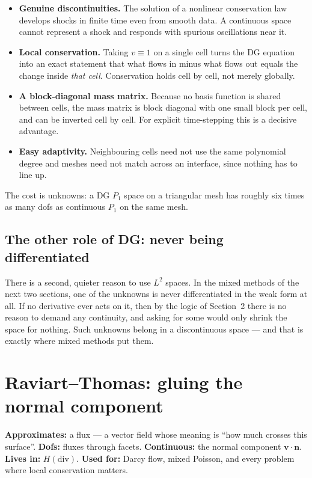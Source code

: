 \documentclass[11pt,a4paper]{article}
\newcommand{\Hdiv}{H(\mathrm{div})}
\newcommand{\bn}{\mathbf{n}}
\newcommand{\bv}{\mathbf{v}}
\begin{document}
\begin{itemize}
\item \textbf{Genuine discontinuities.} The solution of a nonlinear conservation
  law develops shocks in finite time even from smooth data. A continuous space
  cannot represent a shock and responds with spurious oscillations near it.
\item \textbf{Local conservation.} Taking $v \equiv 1$ on a single cell turns
  the DG equation into an exact statement that what flows in minus what flows
  out equals the change inside \emph{that cell}. Conservation holds cell by
  cell, not merely globally.
\item \textbf{A block-diagonal mass matrix.} Because no basis function is shared
  between cells, the mass matrix is block diagonal with one small block per
  cell, and can be inverted cell by cell. For explicit time-stepping this is a
  decisive advantage.
\item \textbf{Easy adaptivity.} Neighbouring cells need not use the same
  polynomial degree and meshes need not match across an interface, since nothing
  has to line up.
\end{itemize}

The cost is unknowns: a DG $P_1$ space on a triangular mesh has roughly six
times as many dofs as continuous $P_1$ on the same mesh.

\subsection{The other role of DG: never being differentiated}

There is a second, quieter reason to use $L^2$ spaces. In the mixed methods of
the next two sections, one of the unknowns is never differentiated in the weak
form at all. If no derivative ever acts on it, then by the logic of
Section~2 there is no reason to demand any continuity, and asking for some
would only shrink the space for nothing. Such unknowns belong in a
discontinuous space --- and that is exactly where mixed methods put them.

\FloatBarrier

\section{Raviart--Thomas: gluing the normal component}
\label{sec:rt}

\begin{keypoint}[cHdiv]
\textbf{Approximates:} a flux --- a vector field whose meaning is ``how much
crosses this surface''.\quad
\textbf{Dofs:} fluxes through facets.\quad
\textbf{Continuous:} the normal component $\bv\cdot\bn$.\quad
\textbf{Lives in:} $\Hdiv$.\quad
\textbf{Used for:} Darcy flow, mixed Poisson, and every problem where local
conservation matters.
\end{keypoint}
\end{document}
